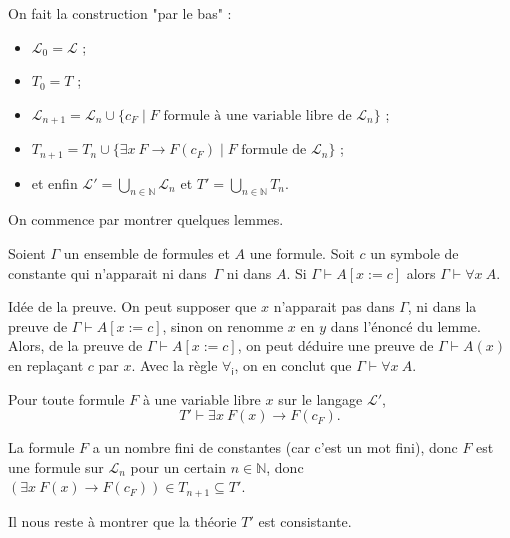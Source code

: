 \documentclass[./main]{subfiles}
\begin{document}
  \begin{prv}
    On fait la construction "par le bas" :
    \begin{itemize}
      \item $\mathcal{L}_0 = \mathcal{L}$ ;
      \item $T_0 = T$ ;
      \item $\mathcal{L}_{n+1} = \mathcal{L}_n \cup \{c_F  \mid F \text{ formule à une variable libre de } \mathcal{L}_n\} $ ;
      \item $T_{n+1} = T_n \cup \{\exists x \: F \to F(c_F)  \mid F \text{ formule de } \mathcal{L}_n\}$ ;
      \item et enfin $\mathcal{L}' = \bigcup_{n \in \mathds{N}} \mathcal{L}_n$ et $T' = \bigcup_{n \in \mathds{N}} T_n$.
    \end{itemize}

    On commence par montrer quelques lemmes.

    \begin{lem}
      \label{lem:fol-var-libre-un-symb}
      Soient $\Gamma$ un ensemble de formules et $A$ une formule.
      Soit $c$ un symbole de constante qui n'apparait ni dans~$\Gamma$ ni dans $A$.
      Si $\Gamma \vdash  A[x := c]$ alors $\Gamma \vdash \forall x\: A$.
    \end{lem}
    \begin{prv}
      Idée de la preuve. On peut supposer que $x$ n'apparait pas dans $\Gamma$, ni dans la preuve de $\Gamma \vdash A[x := c]$, sinon on renomme $x$ en $y$ dans l'énoncé du lemme.
      Alors, de la preuve de $\Gamma \vdash A[x := c]$, on peut déduire une preuve de $\Gamma \vdash A(x)$ en replaçant $c$ par $x$. Avec la règle $\forall_\mathsf{i}$, on en conclut que $\Gamma \vdash \forall x \: A$.
    \end{prv}

    \begin{lem}
      Pour toute formule $F$ à une variable libre $x$ sur le langage $\mathcal{L}'$,
      \[
        T' \vdash \exists x \: F(x) \to F(c_F)
      .\]
    \end{lem}
    \begin{prv}
      La formule $F$ a un nombre fini de constantes (car c'est un mot fini), donc $F$ est une formule sur $\mathcal{L}_n$ pour un certain $n \in \mathds{N}$, donc $(\exists x \: F(x) \to F(c_F)) \in T_{n+1} \subseteq T'$.
    \end{prv}

    Il nous reste à montrer que la théorie $T'$ est consistante.


\end{prv}
\end{document}
